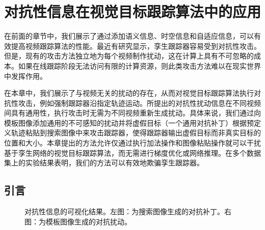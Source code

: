 \chapter{对抗性信息在视觉目标跟踪算法中的应用} \label{chap:attack}
在前面的章节中，我们展示了通过添加语义信息、时空信息和自适应信息，可以有效提高视频跟踪算法的性能。最近有研究显示，孪生跟踪器容易受到对抗性攻击。但是，现有的攻击方法独立地为每个视频制作扰动，这在计算上具有不可忽略的成本。如果在线跟踪阶段无法访问有限的计算资源，则此类攻击方法难以在现实世界中发挥作用。

在本章中，我们展示了与视频无关的扰动的存在，从而对视觉目标跟踪算法执行对抗性攻击，例如强制跟踪器沿指定轨迹运动。所提出的对抗性扰动信息在不同视频间具有通用性，执行攻击时无需为不同视频重新生成扰动。具体来说，我们通过向模板图像添加通用的不可感知的扰动并将虚假目标（一个通用对抗补丁）根据预定义轨迹粘贴到搜索图像中来攻击跟踪器，使得跟踪器输出虚假目标而非真实目标的位置和大小。本章提出的方法允许仅通过执行加法操作和图像粘贴操作就可以干扰基于孪生网络的视觉目标跟踪算法，而无需进行梯度优化或网络推理。在多个数据集上的实验结果表明，我们的方法可以有效地欺骗孪生跟踪器。

\section{引言}

\begin{figure}[t]
\centering
{} \qquad \qquad 
{}
\caption{对抗性信息的可视化结果。左图：为搜索图像生成的对抗补丁。右图：为模板图像生成的对抗扰动。}
\label{fig:attack}
\end{figure}


